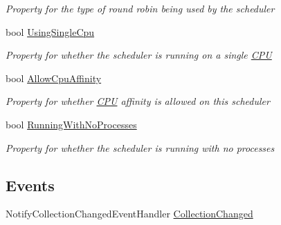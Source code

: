 \begin{DoxyCompactItemize}
\begin{DoxyCompactList}\small\item\em Property for the type of round robin being used by the scheduler \end{DoxyCompactList}\item 
bool \hyperlink{class_c_p_u___o_s___simulator_1_1_operating___system_1_1_scheduler_a3637999160bc25da430731042f42dd81}{Using\+Single\+Cpu}
\begin{DoxyCompactList}\small\item\em Property for whether the scheduler is running on a single \hyperlink{namespace_c_p_u___o_s___simulator_1_1_c_p_u}{C\+P\+U} \end{DoxyCompactList}\item 
bool \hyperlink{class_c_p_u___o_s___simulator_1_1_operating___system_1_1_scheduler_a904a19345a3ceffa809aac3e0ad06321}{Allow\+Cpu\+Affinity}
\begin{DoxyCompactList}\small\item\em Property for whether \hyperlink{namespace_c_p_u___o_s___simulator_1_1_c_p_u}{C\+P\+U} affinity is allowed on this scheduler \end{DoxyCompactList}\item 
bool \hyperlink{class_c_p_u___o_s___simulator_1_1_operating___system_1_1_scheduler_a17ad8e2a5da8823a25da6fa4190f532d}{Running\+With\+No\+Processes}
\begin{DoxyCompactList}\small\item\em Property for whether the scheduler is running with no processes \end{DoxyCompactList}\end{DoxyCompactItemize}
\subsection*{Events}
\begin{DoxyCompactItemize}
\item 
Notify\+Collection\+Changed\+Event\+Handler \hyperlink{class_c_p_u___o_s___simulator_1_1_operating___system_1_1_scheduler_a13cc271f1cf9b76d1cbc87988c45e1fb}{Collection\+Changed}
\end{DoxyCompactItemize}
